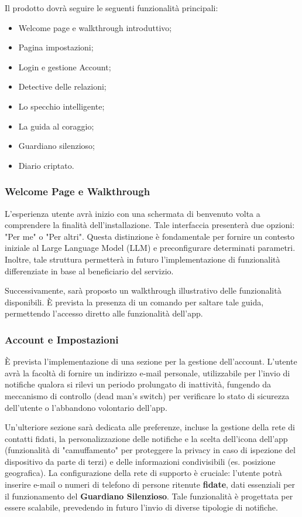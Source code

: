 \documentclass[a4paper,12pt]{article}
\begin{document}
Il prodotto dovrà seguire le seguenti funzionalità principali:

\begin{itemize}
    \item Welcome page e walkthrough introduttivo;
    \item Pagina impostazioni;
    \item Login e gestione Account;
    \item Detective delle relazioni;
    \item Lo specchio intelligente;
    \item La guida al coraggio;
    \item Guardiano silenzioso;
    \item Diario criptato.
\end{itemize}

\subsubsection{Welcome Page e Walkthrough}
L'esperienza utente avrà inizio con una schermata di benvenuto volta a comprendere la finalità dell'installazione. Tale interfaccia presenterà due opzioni: "Per me" o "Per altri". Questa distinzione è fondamentale per fornire un contesto iniziale al Large Language Model (LLM) e preconfigurare determinati parametri. Inoltre, tale struttura permetterà in futuro l'implementazione di funzionalità differenziate in base al beneficiario del servizio.

Successivamente, sarà proposto un walkthrough illustrativo delle funzionalità disponibili. È prevista la presenza di un comando per saltare tale guida, permettendo l'accesso diretto alle funzionalità dell'app.

\subsubsection{Account e Impostazioni}
È prevista l'implementazione di una sezione per la gestione dell'account. L'utente avrà la facoltà di fornire un indirizzo e-mail personale, utilizzabile per l'invio di notifiche qualora si rilevi un periodo prolungato di inattività, fungendo da meccanismo di controllo (dead man's switch) per verificare lo stato di sicurezza dell'utente o l'abbandono volontario dell'app.

Un'ulteriore sezione sarà dedicata alle preferenze, incluse la gestione della rete di contatti fidati, la personalizzazione delle notifiche e la scelta dell'icona dell'app (funzionalità di "camuffamento" per proteggere la privacy in caso di ispezione del dispositivo da parte di terzi) e delle informazioni condivisibili (es. posizione geografica). La configurazione della rete di supporto è cruciale: l'utente potrà inserire e-mail o numeri di telefono di persone ritenute \textbf{fidate}, dati essenziali per il funzionamento del \textbf{Guardiano Silenzioso}. Tale funzionalità è progettata per essere scalabile, prevedendo in futuro l'invio di diverse tipologie di notifiche.
\end{document}

